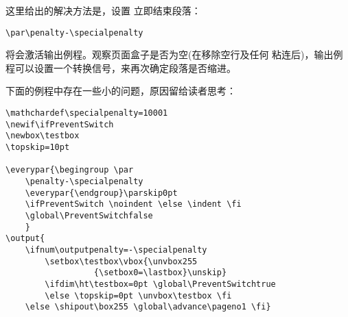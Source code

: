 \documentclass{book}
\begin{document}
这里给出的解决方法是，设置  立即结束段落：

\begin{verbatim}
\par\penalty-\specialpenalty
\end{verbatim}

将会激活输出例程。观察页面盒子是否为空(在移除空行及任何  粘连后)，输出例程可以设置一个转换信号，来再次确定段落是否缩进。



下面的例程中存在一些小的问题，原因留给读者思考：
\begin{verbatim}
\mathchardef\specialpenalty=10001
\newif\ifPreventSwitch
\newbox\testbox
\topskip=10pt

\everypar{\begingroup \par
    \penalty-\specialpenalty
    \everypar{\endgroup}\parskip0pt
    \ifPreventSwitch \noindent \else \indent \fi
    \global\PreventSwitchfalse
    }
\output{
    \ifnum\outputpenalty=-\specialpenalty
        \setbox\testbox\vbox{\unvbox255
                  {\setbox0=\lastbox}\unskip}
        \ifdim\ht\testbox=0pt \global\PreventSwitchtrue
        \else \topskip=0pt \unvbox\testbox \fi
    \else \shipout\box255 \global\advance\pageno1 \fi}
\end{verbatim}
\end{document}
